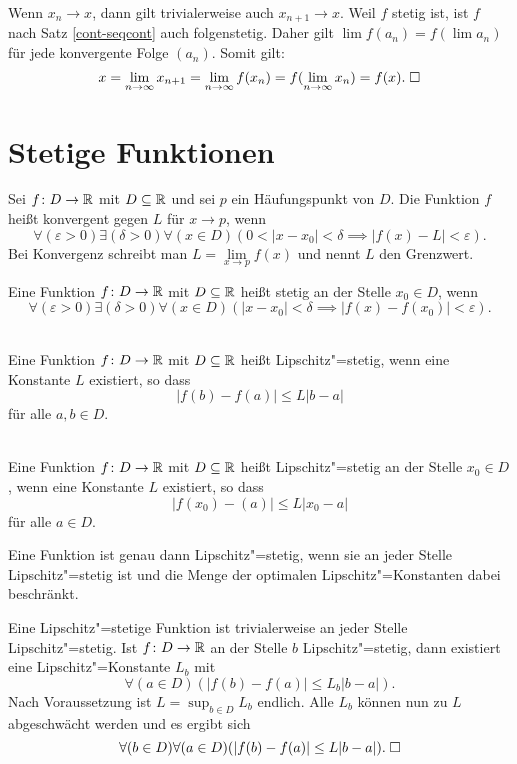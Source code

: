 \begin{Beweis}
Wenn $x_n\to x$, dann gilt trivialerweise auch $x_{n+1}\to x$.
Weil $f$ stetig ist, ist $f$ nach Satz \ref{cont-seqcont}
auch folgenstetig. Daher gilt $\lim f(a_n) = f(\lim a_n)$ für jede
konvergente Folge $(a_n)$. Somit gilt:
\[x=\lim_{n\to\infty} x_{n+1} = \lim_{n\to\infty} f(x_n)
= f(\lim_{n\to\infty} x_n) = f(x).\;\square\]
\end{Beweis}

\section{Stetige Funktionen}

\begin{Definition}\label{fn-lim}
Sei $f\colon D\to\mathbb R$ mit $D\subseteq\mathbb R$ und sei $p$ ein
Häufungspunkt von $D$. Die Funktion $f$ heißt konvergent
gegen $L$ für $x\to p$, wenn%
\[\forall(\varepsilon>0)\exists(\delta>0)\forall(x\in D)(
  0<|x-x_0|<\delta\implies |f(x)-L|<\varepsilon).\]
Bei Konvergenz schreibt man $L=\lim\limits_{x\to p} f(x)$ und nennt $L$ den Grenzwert.
\end{Definition}

\begin{Definition}\label{cont}
Eine Funktion $f\colon D\to\mathbb R$ mit $D\subseteq\mathbb R$ heißt stetig an der
Stelle $x_0\in D$, wenn
\[\forall(\varepsilon>0)\exists(\delta>0)\forall(x\in D)(
  |x-x_0|<\delta\implies |f(x)-f(x_0)|<\varepsilon).\]
\end{Definition}

\begin{Definition}\mbox{}\\
Eine Funktion $f\colon D\to\mathbb R$ mit $D\subseteq\mathbb R$ heißt
Lipschitz"=stetig, wenn eine Konstante $L$ existiert, so dass
\[|f(b)-f(a)|\le L|b-a|\]
für alle $a,b\in D$.
\end{Definition}

\begin{Definition}%
\label{Lipschitz-cont-at}\mbox{}\\
Eine Funktion $f\colon D\to\mathbb R$ mit $D\subseteq\mathbb R$ heißt
Lipschitz"=stetig an der Stelle $x_0\in D$, wenn eine Konstante $L$
existiert, so dass
\[|f(x_0)-(a)|\le L|x_0-a|\]
für alle $a\in D$.
\end{Definition}

\begin{Korollar}
Eine Funktion ist genau dann Lipschitz"=stetig, wenn sie an jeder
Stelle Lipschitz"=stetig ist und die Menge der optimalen
Lipschitz"=Konstanten dabei beschränkt.
\end{Korollar}
\begin{Beweis}
Eine Lipschitz"=stetige Funktion ist trivialerweise an jeder Stelle
Lipschitz"=stetig. Ist $f\colon D\to\mathbb R$ an der Stelle $b$ Lipschitz"=stetig,
dann existiert eine Lipschitz"=Konstante $L_b$ mit%
\[\forall(a\in D)(|f(b)-f(a)|\le L_b |b-a|).\]
Nach Voraussetzung ist $L=\sup_{b\in D} L_b$ endlich. Alle $L_b$ können
nun zu $L$ abgeschwächt werden und es ergibt sich%
\[\forall(b\in D)\forall(a\in D)(|f(b)-f(a)|\le L|b-a|).\;\square\]
\end{Beweis}


